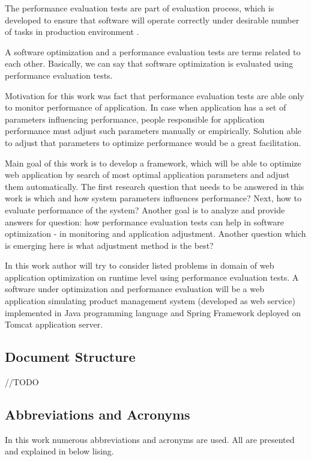 \documentclass[10pt,a4paper]{article}
\begin{document}
The performance evaluation tests are part of evaluation process, which is developed to ensure that software will operate correctly under desirable number of tasks in production environment \cite{analysisofpet}.   

A software optimization and a performance evaluation tests are terms related to each other. Basically, we can say that software optimization is evaluated using performance evaluation tests. 

Motivation for this work was fact that performance evaluation tests are able only to monitor performance of application. In case when application has a set of parameters influencing performance, people responsible for application performance must adjust such parameters manually or empirically. Solution able to adjust that parameters to optimize performance would be a great facilitation. 

Main goal of this work is to develop a framework, which will be able to optimize web application by search of most optimal application parameters and adjust them automatically. The first research question that needs to be answered in this work is which and how system parameters influences performance? Next, how to evaluate performance of the system? Another goal is to analyze and provide answers for question: how performance evaluation tests can help in software optimization - in monitoring and application adjustment. Another question which is emerging here is what adjustment method is the best? 

In this work author will try to consider listed problems in domain of web application optimization on runtime level using performance evaluation tests. A software under optimization and performance evaluation will be a web application simulating product management system (developed as web service) implemented in Java programming language and Spring Framework deployed on Tomcat application server. 

\subsection{Document Structure}

//TODO

\subsection{Abbreviations and Acronyms}
In this work numerous abbreviations and acronyms are used. All are presented and explained in below lising.
\end{document}
